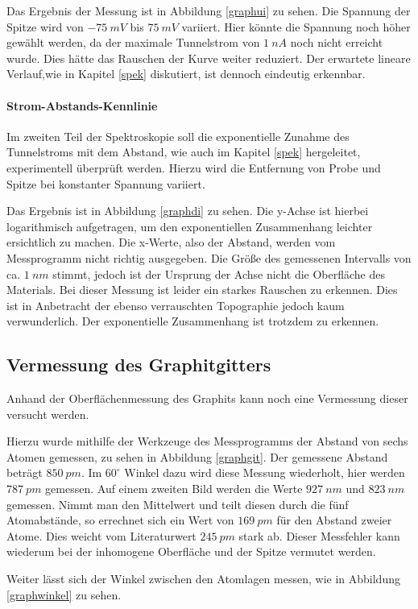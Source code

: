 Das Ergebnis der Messung ist in Abbildung \ref{graphui} zu sehen. Die Spannung der 
Spitze wird von $\SI{-75}{mV}$ bis $\SI{75}{mV}$ variiert. Hier könnte die Spannung
noch höher gewählt werden, da der maximale Tunnelstrom von $\SI{1}{nA}$ noch nicht
erreicht wurde. Dies hätte das Rauschen der Kurve weiter reduziert.
Der erwartete lineare Verlauf,wie in Kapitel \ref{spek} diskutiert,
ist dennoch eindeutig erkennbar.

\paragraph{Strom-Abstands-Kennlinie}
Im zweiten Teil der Spektroskopie soll die exponentielle Zunahme des Tunnelstroms
mit dem Abstand, wie auch im Kapitel \ref{spek} hergeleitet, experimentell 
überprüft werden. Hierzu wird die Entfernung von Probe und Spitze bei konstanter
Spannung variiert. 

Das Ergebnis ist in Abbildung \ref{graphdi} zu sehen. Die y-Achse ist hierbei
logarithmisch aufgetragen, um den exponentiellen Zusammenhang leichter ersichtlich
zu machen. Die x-Werte, also der Abstand, werden vom Messprogramm nicht richtig
ausgegeben. Die Größe des gemessenen Intervalls von ca. $\SI{1}{nm}$ stimmt, 
jedoch ist der Ursprung der Achse nicht die Oberfläche des Materials.
Bei dieser Messung ist leider ein starkes Rauschen zu erkennen. Dies ist in 
Anbetracht der ebenso verrauschten Topographie jedoch kaum verwunderlich.
Der exponentielle Zusammenhang ist trotzdem zu erkennen.

\subsection{Vermessung des Graphitgitters}
Anhand der Oberflächenmessung des Graphits kann noch eine Vermessung dieser
versucht werden.

Hierzu wurde mithilfe der Werkzeuge des Messprogramms der Abstand von sechs
Atomen gemessen, zu sehen in Abbildung \ref{graphgit}. Der gemessene Abstand
beträgt $\SI{850}{pm}$. Im $60^\circ$ Winkel dazu wird diese Messung wiederholt,
hier werden $\SI{787}{pm}$ gemessen. Auf einem zweiten Bild werden die Werte
$\SI{927}{nm}$ und $\SI{823}{nm}$ gemessen. Nimmt man den Mittelwert und teilt
diesen durch die fünf Atomabstände, so errechnet sich ein Wert von $\SI{169}{pm}$
für den Abstand zweier Atome.
Dies weicht vom Literaturwert $\SI{245}{pm}$ stark ab. Dieser Messfehler kann 
wiederum bei der inhomogene Oberfläche und der Spitze vermutet werden.\par
Weiter lässt sich der Winkel zwischen den Atomlagen messen, wie in Abbildung
\ref{graphwinkel} zu sehen. 

